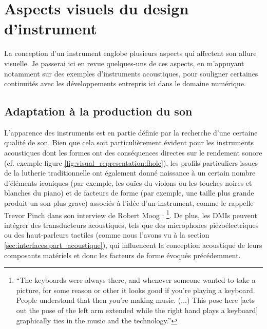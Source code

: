 \clearpage

\section{Aspects visuels du design d'instrument}

\noindent La conception d'un instrument englobe plusieurs aspects qui affectent son allure visuelle. Je passerai ici en revue quelques-uns de ces aspects, en m'appuyant notamment sur des exemples d'instruments acoustiques, pour souligner certaines continuités avec les développements entrepris ici dans le domaine numérique.

\subsection{Adaptation à la production du son}
\label{sec:visual_representation:visual_aspects:adaptation_to_sound}


\noindent L'apparence des instruments est en partie définie par la recherche d'une certaine qualité de son. Bien que cela soit particulièrement évident pour les instruments acoustiques dont les formes ont des conséquences directes sur le rendement sonore (cf. exemple figure \ref{fig:visual_representation:fhole}), les profils particuliers issues de la lutherie traditionnelle ont également donné naissance à un certain nombre d'éléments iconiques (par exemple, les ouïes du violons ou les touches noires et blanches du piano) et de facteurs de forme (par exemple, une taille plus grande produit un son plus grave) associés à l'idée d'un instrument, comme le rappelle Trevor Pinch dans son interview de Robert Moog \cite{pinch_why_2001}: \footnote{``The keyboards were always there, and whenever someone wanted to take a picture, for some reason or other it looks good if you’re playing a keyboard. People understand that then you’re making music. (...) This pose here [acts out the pose of the left arm extended while the right hand plays a keyboard] graphically ties in the music and the technology.''}. De plus, les \glspl{DMI} peuvent intégrer des transducteurs acoustiques, tels que des microphones piézoélectriques ou des haut-parleurs tactiles (comme nous l'avons vu à la section \ref{sec:interfaces:part_acoustique}), qui influencent la conception acoustique de leurs composants matériels et donc les facteurs de forme évoqués précédemment.

